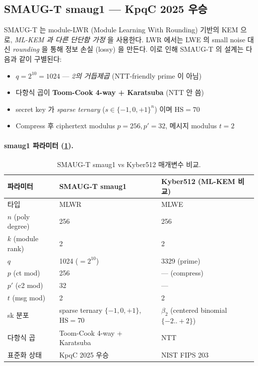 \documentclass[11pt]{article}
\theoremstyle{plain}
\theoremstyle{definition}
\theoremstyle{remark}
\newcommand{\HS}{\mathrm{HS}}
\begin{document}
\subsection{SMAUG-T smaug1 — KpqC 2025 우승}

SMAUG-T 는 module-LWR (Module Learning With Rounding) 기반의 KEM 으로,
\emph{ML-KEM 과 다른 단단함 가정} 을 사용한다. LWR 에서는 LWE 의 small noise
대신 \emph{rounding} 을 통해 정보 손실 (lossy) 을 만든다. 이로 인해 SMAUG-T 의
설계는 다음과 같이 구별된다:

\begin{itemize}[leftmargin=*]
\item $q = 2^{10} = 1024$ — \emph{2의 거듭제곱} (NTT-friendly prime 이 아님)
\item 다항식 곱이 \textbf{Toom-Cook 4-way + Karatsuba} (NTT 안 씀)
\item secret key 가 \emph{sparse ternary} ($s \in \{-1, 0, +1\}^n$) 이며 $\HS = 70$
\item Compress 후 ciphertext modulus $p = 256, p' = 32$, 메시지 modulus $t = 2$
\end{itemize}

\paragraph{smaug1 파라미터 (\cref{tab:smaug1}).}

\begin{table}[h!]
\centering
\caption{SMAUG-T smaug1 vs Kyber512 매개변수 비교.}
\label{tab:smaug1}
\small
\begin{tabular}{lll}
\toprule
파라미터 & SMAUG-T smaug1 & Kyber512 (ML-KEM 비교) \\
\midrule
타입 & MLWR & MLWE \\
$n$ (poly degree) & 256 & 256 \\
$k$ (module rank) & 2 & 2 \\
$q$ & 1024 ($=2^{10}$) & 3329 (prime) \\
$p$ (ct mod) & 256 & — (compress) \\
$p'$ (c2 mod) & 32 & — \\
$t$ (msg mod) & 2 & 2 \\
sk 분포 & sparse ternary $\{-1,0,+1\}$, $\HS=70$ & $\beta_2$ (centered binomial $\{-2..+2\}$) \\
다항식 곱 & Toom-Cook 4-way + Karatsuba & NTT \\
표준화 상태 & KpqC 2025 우승 & NIST FIPS 203 \\
\bottomrule
\end{tabular}
\end{table}
\end{document}
